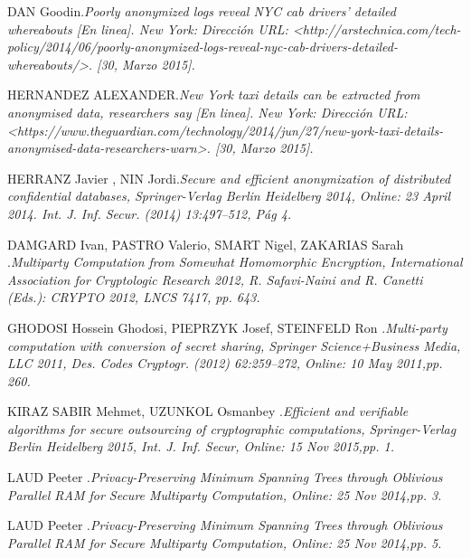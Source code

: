 \documentclass[a4paper, 11pt, oneside]{article}
\theoremstyle{definition}
\theoremstyle{remark}
\begin{document}

\begin{thebibliography}{99}


DAN Goodin.\emph{Poorly anonymized logs reveal NYC cab drivers’ detailed whereabouts [En linea]. New York: Dirección URL: <http://arstechnica.com/tech-policy/2014/06/poorly-anonymized-logs-reveal-nyc-cab-drivers-detailed-whereabouts/>. [30, Marzo 2015].}

HERNANDEZ ALEXANDER.\emph{New York taxi details can be extracted from anonymised data, researchers say [En linea]. New York: Dirección URL: <https://www.theguardian.com/technology/2014/jun/27/new-york-taxi-details-anonymised-data-researchers-warn>. [30, Marzo 2015].}

HERRANZ Javier , NIN Jordi.\emph{Secure and efficient anonymization of distributed confidential databases, Springer-Verlag Berlin Heidelberg 2014, Online: 23 April 2014. Int. J. Inf. Secur. (2014) 13:497–512, Pág 4.}

DAMGARD Ivan, PASTRO Valerio, SMART Nigel, ZAKARIAS Sarah .\emph{Multiparty Computation from Somewhat Homomorphic Encryption, International Association for Cryptologic Research 2012, R. Safavi-Naini and R. Canetti (Eds.): CRYPTO 2012, LNCS 7417, pp. 643.}

GHODOSI Hossein Ghodosi, PIEPRZYK Josef, STEINFELD Ron .\emph{Multi-party computation with conversion of secret sharing, Springer Science+Business Media, LLC 2011, Des. Codes Cryptogr. (2012) 62:259–272, Online: 10 May 2011,pp. 260.}

KIRAZ SABIR Mehmet, UZUNKOL Osmanbey .\emph{Efficient and verifiable algorithms for secure outsourcing of cryptographic computations, Springer-Verlag Berlin Heidelberg 2015, Int. J. Inf. Secur, Online: 15 Nov 2015,pp. 1.}

LAUD Peeter .\emph{Privacy-Preserving Minimum Spanning Trees through Oblivious Parallel RAM for Secure Multiparty Computation, Online: 25 Nov 2014,pp. 3.}

LAUD Peeter .\emph{Privacy-Preserving Minimum Spanning Trees through Oblivious Parallel RAM for Secure Multiparty Computation, Online: 25 Nov 2014,pp. 5.}


\end{thebibliography}
\end{document}
